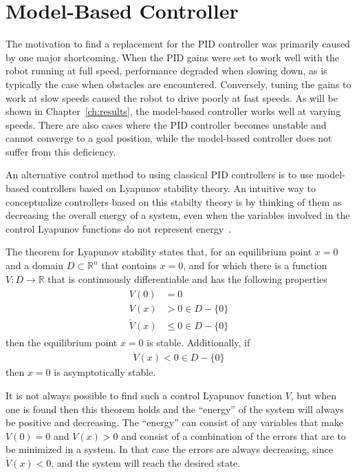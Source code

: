 \section{Model-Based Controller}%
\label{sec:lyapunov}
The motivation to find a replacement for the PID controller was primarily caused by one major shortcoming.
When the PID gains were set to work well with the robot running at full speed, performance degraded when slowing down, as is typically the case when obstacles are encountered.
Conversely, tuning the gains to work at slow speeds caused the robot to drive poorly at fast speeds.
As will be shown in Chapter~\ref{ch:results}, the model-based controller works well at varying speeds.
There are also cases where the PID controller becomes unstable and cannot converge to a goal position, while the model-based controller does not suffer from this deficiency.

An alternative control method to using classical PID controllers is to use model-based controllers based on Lyapunov stability theory.
An intuitive way to conceptualize controllers based on this stabilty theory is by thinking of them as decreasing the overall energy of a system, even when the variables involved in the control Lyapunov functions do not represent energy~\cite{Khalil02}.

The theorem for Lyapunov stability states that, for an equilibrium point $x=0$ and a domain $D\subset\mathbb{R}^n$ that contains $x=0$, and for which there is a function $V:D\to\mathbb{R}$ that is continuously differentiable and has the following properties 
\begin{align}
\label{eq:lyapunovTheorem}
\begin{split}
V(0) &= 0 \\
V(x) &> 0 \in D-\{0\} \\
\dot{V}(x) &\leq 0 \in D-\{0\}
\end{split}
\end{align}
then the equilibrium point $x=0$ is stable.
Additionally, if
\begin{align}
\label{eq:lyapunovAsymptoticStability}
\dot{V}(x) < 0 \in D - \{0\}
\end{align}
then $x=0$ is asymptotically stable.

It is not always possible to find such a control Lyapunov function $V$, but when one is found then this theorem holds and the ``energy'' of the system will always be positive and decreasing.
The ``energy'' can consist of any variables that make $V(0) = 0$ and $V(x) > 0$ and consist of a combination of the errors that are to be minimized in a system.
In that case the errors are always decreasing, since $\dot{V}(x) < 0$, and the system will reach the desired state.

